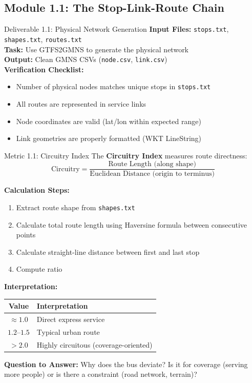 \documentclass[11pt,letterpaper]{article}
\begin{document}
\subsection{Module 1.1: The Stop-Link-Route Chain}

\begin{deliverablebox}{Deliverable 1.1: Physical Network Generation}
\textbf{Input Files:} \texttt{stops.txt}, \texttt{shapes.txt}, \texttt{routes.txt}\\
\textbf{Task:} Use GTFS2GMNS to generate the physical network\\
\textbf{Output:} Clean GMNS CSVs (\texttt{node.csv}, \texttt{link.csv})\\[0.3cm]
\textbf{Verification Checklist:}
\begin{itemize}[nosep]
    \item[$\square$] Number of physical nodes matches unique stops in \texttt{stops.txt}
    \item[$\square$] All routes are represented in service links
    \item[$\square$] Node coordinates are valid (lat/lon within expected range)
    \item[$\square$] Link geometries are properly formatted (WKT LineString)
\end{itemize}
\end{deliverablebox}

\begin{metricbox}{Metric 1.1: Circuitry Index}
The \textbf{Circuitry Index} measures route directness:
\[
\text{Circuitry} = \frac{\text{Route Length (along shape)}}{\text{Euclidean Distance (origin to terminus)}}
\]

\textbf{Calculation Steps:}
\begin{enumerate}[nosep]
    \item Extract route shape from \texttt{shapes.txt}
    \item Calculate total route length using Haversine formula between consecutive points
    \item Calculate straight-line distance between first and last stop
    \item Compute ratio
\end{enumerate}

\textbf{Interpretation:}
\begin{center}
\begin{tabular}{cl}
\toprule
\textbf{Value} & \textbf{Interpretation} \\
\midrule
$\approx 1.0$ & Direct express service \\
$1.2$--$1.5$ & Typical urban route \\
$> 2.0$ & Highly circuitous (coverage-oriented) \\
\bottomrule
\end{tabular}
\end{center}

\textbf{Question to Answer:} Why does the bus deviate? Is it for coverage (serving more people) or is there a constraint (road network, terrain)?
\end{metricbox}
\end{document}
